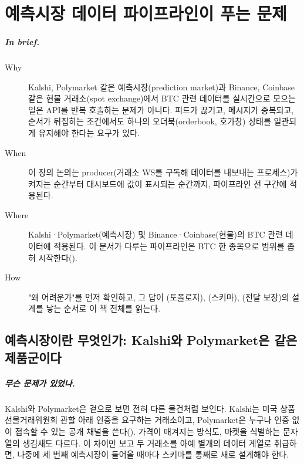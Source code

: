 \chapter{예측시장 데이터 파이프라인이 푸는 문제}
\label{ch:problem}

\paragraph{In brief.}
\begin{description}
  \item[Why] Kalshi, Polymarket 같은 예측시장(prediction market)과 Binance, Coinbase 같은
    현물 거래소(spot exchange)에서 BTC 관련 데이터를 실시간으로 모으는 일은 API를 반복
    호출하는 문제가 아니다. 피드가 끊기고, 메시지가 중복되고, 순서가 뒤집히는 조건에서도
    하나의 오더북(orderbook, 호가창) 상태를 일관되게 유지해야 한다는 요구가 있다.
  \item[When] 이 장의 논의는 producer(거래소 WS를 구독해 데이터를 내보내는 프로세스)가
    켜지는 순간부터 대시보드에 값이 표시되는 순간까지, 파이프라인 전 구간에 적용된다.
  \item[Where] Kalshi·Polymarket(예측시장) 및 Binance·Coinbase(현물)의 BTC 관련 데이터에
    적용된다. 이 문서가 다루는 파이프라인은 BTC 한 종목으로 범위를 좁혀 시작한다().
  \item[How] "왜 어려운가"를 먼저 확인하고, 그 답이 (토폴로지),
    (스키마), (전달 보장)의 설계를 낳는 순서로
    이 책 전체를 읽는다.
\end{description}

\section{예측시장이란 무엇인가: Kalshi와 Polymarket은 같은 제품군이다}
\label{sec:problem-prediction-market}

\paragraph{무슨 문제가 있었나.} Kalshi와 Polymarket은 겉으로 보면 전혀 다른 물건처럼
보인다. Kalshi는 미국 상품선물거래위원회 관할 아래 인증을 요구하는 거래소이고,
Polymarket은 누구나 인증 없이 접속할 수 있는 공개 채널을 쓴다().
가격이 매겨지는 방식도, 마켓을 식별하는 문자열의 생김새도 다르다. 이 차이만 보고 두
거래소를 아예 별개의 데이터 계열로 취급하면, 나중에 세 번째 예측시장이 들어올 때마다
스키마를 통째로 새로 설계해야 한다.

